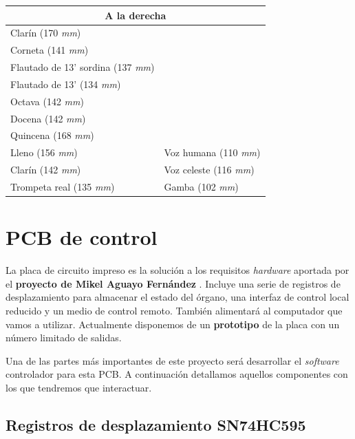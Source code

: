 \begin{center}
	\begin{tabular}{|l|l|}
		\hline \multicolumn{2}{|c|}{\textbf{A la derecha}} \\
		\hline Clarín (170 \textit{mm}) &  \\ 
		\hline Corneta (141 \textit{mm}) &  \\ 
		\hline Flautado de 13' sordina (137 \textit{mm}) &  \\ 
		\hline Flautado de 13' (134 \textit{mm}) &  \\ 
		\hline Octava (142 \textit{mm}) & \\ 
		\hline Docena (142 \textit{mm}) & \\ 
		\hline Quincena (168 \textit{mm}) & \\ 
		\hline Lleno (156 \textit{mm}) & Voz humana (110 \textit{mm}) \\ 
		\hline Clarín (142 \textit{mm}) & Voz celeste (116 \textit{mm}) \\ 
		\hline Trompeta real (135 \textit{mm}) & Gamba (102 \textit{mm}) \\ 
		\hline 
	\end{tabular}
	\smallskip
\end{center}

\smallskip

\newpage

\section{PCB de control}

La placa de circuito impreso es la solución a los requisitos \textit{hardware} aportada por el \textbf{proyecto de Mikel Aguayo Fernández} \cite{mikel}. Incluye una serie de registros de desplazamiento para almacenar el estado del órgano, una interfaz de control local reducido y un medio de control remoto. También alimentará al computador que vamos a utilizar. Actualmente disponemos de un \textbf{prototipo} de la placa con un número limitado de salidas.

Una de las partes más importantes de este proyecto será desarrollar el \textit{software} controlador para esta \acrshort{PCB}. A continuación detallamos aquellos componentes con los que tendremos que interactuar.

\subsection{Registros de desplazamiento SN74HC595}

